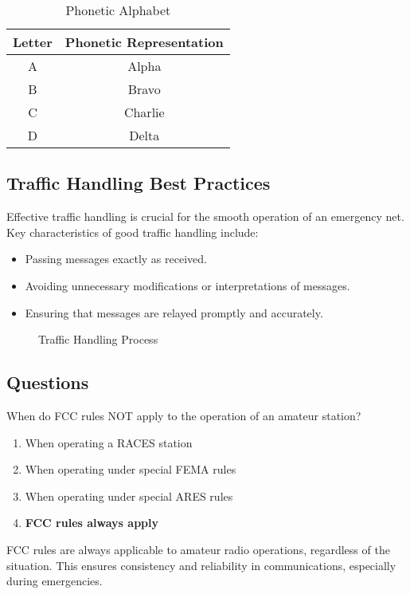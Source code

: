 \begin{table}[h]
    \centering
    \caption{Phonetic Alphabet}
    \label{tab:phonetic_alphabet}
    \begin{tabular}{|c|c|}
        \hline
        \textbf{Letter} & \textbf{Phonetic Representation} \\
        \hline
        A & Alpha \\
        B & Bravo \\
        C & Charlie \\
        D & Delta \\
        \hline
    \end{tabular}
\end{table}

\subsection*{Traffic Handling Best Practices}
Effective traffic handling is crucial for the smooth operation of an emergency net. Key characteristics of good traffic handling include:
\begin{itemize}
    \item Passing messages exactly as received.
    \item Avoiding unnecessary modifications or interpretations of messages.
    \item Ensuring that messages are relayed promptly and accurately.
\end{itemize}

\begin{figure}[h]
    \centering
    \caption{Traffic Handling Process}
    \label{fig:traffic_handling}
\end{figure}

\subsection*{Questions}
\begin{tcolorbox}[colback=gray!10!white,colframe=black!75!black,title={T2C01}]
    When do FCC rules NOT apply to the operation of an amateur station?
    \begin{enumerate}[label=\Alph*),noitemsep]
        \item When operating a RACES station
        \item When operating under special FEMA rules
        \item When operating under special ARES rules
        \item \textbf{FCC rules always apply}
    \end{enumerate}
\end{tcolorbox}
FCC rules are always applicable to amateur radio operations, regardless of the situation. This ensures consistency and reliability in communications, especially during emergencies.

